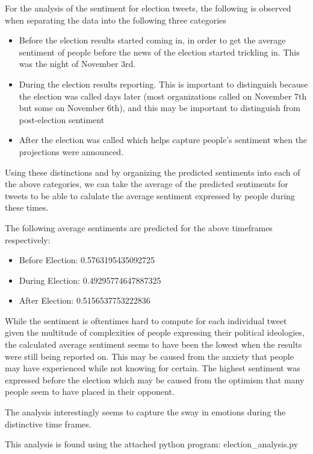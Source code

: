 \documentclass{article}
\begin{document}
For the analysis of the sentiment for election tweets, the following is observed when separating the data into the following three categories
\begin{itemize}
    \item Before the election results started coming in, in order to get the average sentiment of people before the news of the election started trickling in. This was the night of November 3rd.
    \item During the election results reporting. This is important to distinguish because the election was called days later (most organizations called on November 7th but some on November 6th), and this may be important to distinguish from post-election sentiment
    \item After the election was called which helps capture people's sentiment when the projections were announced.
\end{itemize}

\noindent Using these distinctions and by organizing the predicted sentiments into each of the above categories, we can take the average of the predicted sentiments for tweets to be able to calulate the average sentiment expressed by people during these times. 

\noindent The following average sentiments are predicted for the above timeframes respectively: 

\begin{itemize}
    \item Before Election: 0.5763195435092725
    \item During Election: 0.49295774647887325
    \item After Election: 0.5156537753222836
\end{itemize}

\noindent While the sentiment is oftentimes hard to compute for each individual tweet given the multitude of complexities of people expressing their political ideologies, the calculated average sentiment seems to have been the lowest when the results were still being reported on. This may be caused from the anxiety that people may have experienced while not knowing for certain. The highest sentiment was expressed before the election which may be caused from the optimism that many people seem to have placed in their opponent. 

\noindent The analysis interestingly seems to capture the sway in emotions during the distinctive time frames. 

\noindent This analysis is found using the attached python program: election\_analysis.py
\end{document}
